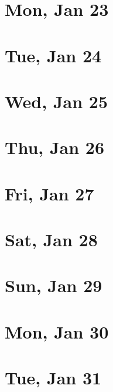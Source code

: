 	\section{Mon, Jan 23}
		
	\section{Tue, Jan 24}
		
	\section{Wed, Jan 25}
		
	\section{Thu, Jan 26}
		
	\section{Fri, Jan 27}
		
	\section{Sat, Jan 28}
		
	\section{Sun, Jan 29}
		
	\section{Mon, Jan 30}
		
	\section{Tue, Jan 31}
		
